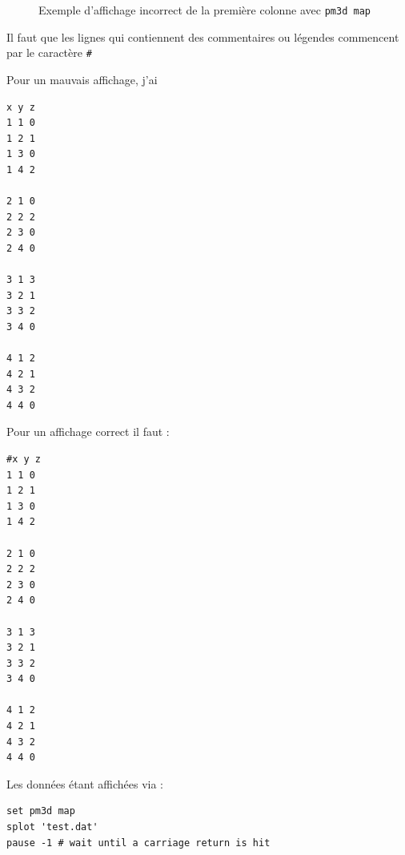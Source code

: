 \documentclass[a4paper,twoside]{article}
\begin{document}
\begin{figure}[htb]
\centering
{}\hfill
{}
\caption{Exemple d'affichage incorrect de la première colonne avec \texttt{pm3d map}}
\end{figure}

\begin{important}
Il faut que les lignes qui contiennent des commentaires ou légendes commencent par le caractère \verb|#|
\end{important}


Pour un mauvais affichage, j'ai 
\begin{verbatim}
x y z
1 1 0
1 2 1
1 3 0
1 4 2

2 1 0
2 2 2
2 3 0
2 4 0

3 1 3
3 2 1
3 3 2
3 4 0

4 1 2
4 2 1
4 3 2
4 4 0
\end{verbatim}

Pour un affichage correct il faut : 
\begin{verbatim}
#x y z
1 1 0
1 2 1
1 3 0
1 4 2

2 1 0
2 2 2
2 3 0
2 4 0

3 1 3
3 2 1
3 3 2
3 4 0

4 1 2
4 2 1
4 3 2
4 4 0
\end{verbatim}

\begin{remarque}
Les données étant affichées via : 
\begin{verbatim}
set pm3d map
splot 'test.dat'
pause -1 # wait until a carriage return is hit
\end{verbatim}

\end{remarque}
\end{document}
